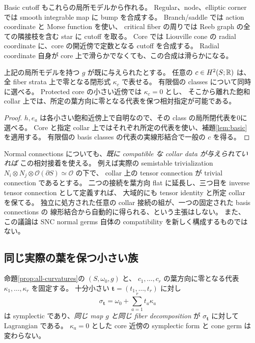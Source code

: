 Basic cutoff もこれらの局所モデルから作れる。
Regular、node、elliptic corner では smooth integrable map に bump を合成する。
Branch/saddle では action coordinate と Morse function を使い、
critical fiber の周りでは Reeb graph の全ての隣接枝を含む star に cutoff を取る。
Core では Liouville cone の radial coordinate に、core の開近傍で定数となる cutoff を合成する。
Radial coordinate 自身が core 上で滑らかでなくても、この合成は滑らかになる。

\begin{proposition}\label{prop:all-curvatures}
上記の局所モデルを持つ $g$ が既に与えられたとする。
任意の $c\in H^2(S;\mathbb R)$ は、全 fiber strata 上で零となる閉形式 $\kappa_c$ で表せる。
有限個の classes について同時に選べる。
Protected core の小さい近傍では $\kappa_c=0$ とし、
そこから離れた飽和 collar 上では、所定の葉方向に零となる代表を保つ相対指定が可能である。
\end{proposition}

\begin{proof}
$h,e_a$ は各小さい飽和近傍上で自明なので、その class の局所閉代表を0に選べる。
Core と指定 collar 上ではそれぞれ所定の代表を使い、補題\ref{lem:basic}を適用する。
有限個の basis classes の代表の実線形結合で一般の $c$ を得る。
\end{proof}

Normal connections についても、\emph{既に compatible な collar data が与えられていれば}
この相対接着を使える。
例えば実際の semistable trivialization
$N_i\otimes N_j\otimes\mathcal O(\partial S)\simeq\mathcal O$ の下で、
collar 上の tensor connection が trivial connection であるとする。
二つの接続を葉方向 flat に延長し、三つ目を inverse tensor connection として定義すれば、
大域的にも tensor identity と所定 collar を保てる。
独立に処方された任意の collar 接続の組が、一つの固定された basis connections の
線形結合から自動的に得られる、という主張はしない。
また、この議論は SNC normal germs 自体の compatibility を新しく構成するものではない。

\subsection{同じ実際の葉を保つ小さい族}

\begin{theorem}[局所多変数変形]\label{thm:small-family}
命題\ref{prop:all-curvatures}の $(S,\omega_0,g)$ と、
$c_1,\ldots,c_r$ の葉方向に零となる代表 $\kappa_1,\ldots,\kappa_r$ を固定する。
十分小さい $\mathbf t=(t_1,\ldots,t_r)$ に対し
\begin{equation}\label{eq:small-family}
\sigma_{\mathbf t}=\omega_0+\sum_{a=1}^r t_a\kappa_a
\end{equation}
は symplectic であり、\emph{同じ map $g$ と同じ fiber decomposition} が
$\sigma_{\mathbf t}$ に対して Lagrangian である。
$\kappa_a=0$ とした core 近傍の symplectic form と cone germ は変わらない。
\end{theorem}

